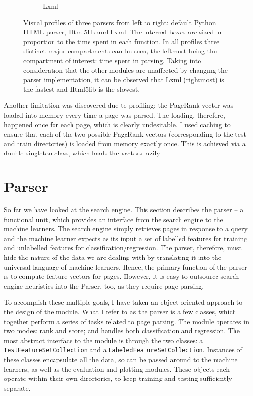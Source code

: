 \documentclass[12pt,a4paper,notitlepage,twoside]{scrbook}
\begin{document}
\begin{figure}[h!]
\begin{subfigure}[b]{.3\textwidth}
  \caption{Lxml}
  \label{lxml}
\end{subfigure}
\caption{Visual profiles of three parsers from left to right: default Python
HTML parser, Html5lib and Lxml. The internal boxes are sized in proportion to
the time spent in each function. In all profiles three distinct major
compartments can be seen, the leftmost being the compartment of interest: 
time spent in parsing. Taking into consideration that the other modules are unaffected by changing the parser
implementation, it can be observed that Lxml (rightmost) is the fastest and
Html5lib is the slowest.\label{parsers}}
\end{figure}

Another limitation was discovered due to profiling: the PageRank vector
was loaded into memory every time a page was parsed. The loading, therefore, happened once for each page, which
is clearly undesirable. I used caching to ensure that each of the two possible
PageRank vectors (corresponding to the test and train directories) is loaded
from memory exactly once. This is achieved via a double singleton class, which
loads the vectors lazily.


\section{Parser}
\label{sec:parser}
So far we have looked at the search engine. This section describes the parser -- a
functional unit, which provides an interface from the search engine to the machine
learners. The search engine simply retrieves pages in response to a query and the machine
learner expects as its input a set of labelled features for training and unlabelled
features for classification/regression. The parser, therefore, must hide the nature of
the data we are dealing with by translating it into the universal language of machine
learners. Hence, the primary function of the parser is to compute feature vectors for
pages. However, it is easy to outsource search engine heuristics into the Parser, too, as
they require page parsing. 

To accomplish these multiple goals, I have
taken an object oriented approach to the design of the module. What I refer to
as the parser is a few classes, which together perform a series of tasks
related to page parsing. The module operates in two modes: rank and score; and
handles both classification and regression. The most abstract interface to the module is through the two
classes: a \texttt{TestFeatureSetCollection} and a
\texttt{LabeledFeatureSetCollection}. Instances of these classes encapsulate all the data,
so can be passed around to the machine learners, as well as the evaluation and
plotting modules. These objects each operate within their own directories, to
keep training and testing sufficiently separate.
\end{document}
